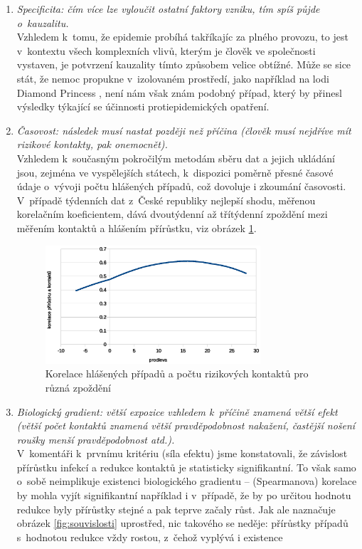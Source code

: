 \begin{enumerate}
\item \emph{Specificita: čím více lze vyloučit ostatní faktory vzniku, tím
spíš půjde o~kauzalitu.}\\
Vzhledem k~tomu, že epidemie probíhá takříkajíc za plného provozu,
to jest v~kontextu všech komplexních vlivů, kterým je člověk ve společnosti
vystaven, je potvrzení kauzality tímto způsobem velice obtížné.
Může se sice stát, že nemoc propukne v~izolovaném prostředí, jako
například na lodi Diamond Princess \cite{mizumoto2020transmission},
není nám však znám podobný případ, který by přinesl výsledky týkající
se účinnosti protiepidemických opatření. 
\item \emph{Časovost: následek musí nastat později než příčina (člověk musí
nejdříve mít rizikové kontakty, pak onemocnět).}\\
Vzhledem k~současným pokročilým metodám sběru dat a jejich ukládání
jsou, zejména ve vyspělejších státech, k~dispozici poměrně přesné
časové údaje o~vý\-vo\-ji počtu hlášených případů, což dovoluje i zkoumání časovosti.
V~případě tý\-den\-ních dat z~České republiky nejlepší shodu, měřenou
korelačním koeficientem, dává dvoutýdenní až třítýdenní zpoždění mezi měřením
kontaktů a hlášením pří\-růst\-ku, viz obrázek \ref{fig:korelace}.
\begin{figure}
\begin{center}
\includegraphics[width=8cm]{pic/lagsel.eps}
\caption{Korelace hlášených případů a počtu rizikových kontaktů pro různá zpoždění}
\label{fig:korelace}
\end{center}
\end{figure}
\item \emph{Biologický gradient: větší expozice vzhledem k~příčině znamená
větší efekt (větší počet kontaktů znamená větší pravděpodobnost nakažení,
častější nošení roušky menší pravděpodobnost atd.).}\\
V~komentáři k~prvnímu kritériu (síla efektu) jsme konstatovali, že závislost přírůstku infekcí a redukce kontaktů je statisticky signifikantní. To však samo o~sobě neimplikuje existenci biologického gradientu -- (Spearmanova) korelace by mohla vyjít signifikantní například i v~případě, že by po určitou hodnotu redukce byly přírůstky stejné a pak teprve začaly růst. Jak ale naznačuje obrázek \ref{fig:souvislosti} uprostřed, nic takového se neděje: přírůstky případů s~hodnotou redukce vždy rostou, z~čehož vyplývá i existence

\end{enumerate}
